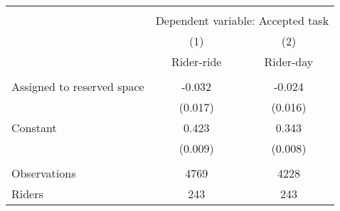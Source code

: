 \begin{tabular}{l*{1}{cc}} \hline\hline \\[-1.8ex] & \multicolumn{2}{c}{Dependent variable: Accepted task} \\
                    &\multicolumn{1}{c}{(1)}&\multicolumn{1}{c}{(2)}\\
                    &\multicolumn{1}{c}{Rider-ride}&\multicolumn{1}{c}{Rider-day}\\
\hline \\[-1.8ex]
Assigned to reserved space&      -0.032\sym{*}  &      -0.024         \\
                    &     (0.017)         &     (0.016)         \\
[1em]
Constant            &       0.423\sym{***}&       0.343\sym{***}\\
                    &     (0.009)         &     (0.008)         \\
\hline \\[-1.8ex]
Observations        &        4769         &        4228         \\
Riders              &         243         &         243         \\
\hline\hline \end{tabular}
